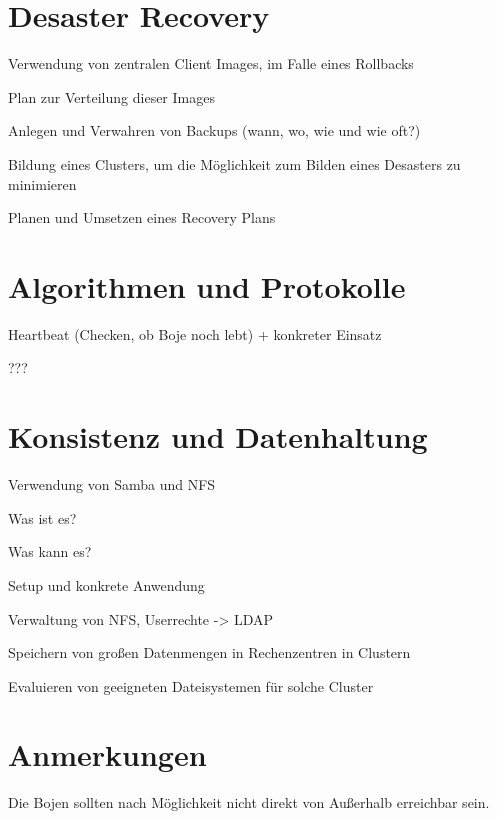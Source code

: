 \section{Desaster Recovery}
\label{sec:Desaster Recovery}
Verwendung von zentralen Client Images, im Falle eines Rollbacks

Plan zur Verteilung dieser Images

Anlegen und Verwahren von Backups (wann, wo, wie und wie oft?)

Bildung eines Clusters, um die Möglichkeit zum Bilden eines Desasters zu minimieren

Planen und Umsetzen eines Recovery Plans


\section{Algorithmen und Protokolle}
\label{sec:Algorithmen und Protokolle}
Heartbeat (Checken, ob Boje noch lebt) +  konkreter Einsatz

???



\section{Konsistenz und Datenhaltung}
\label{sec:Konsistenz und Datenhaltung}
Verwendung von Samba und NFS

Was ist es?

Was kann es?

Setup und konkrete Anwendung

Verwaltung von NFS, Userrechte -> LDAP

Speichern von großen Datenmengen in Rechenzentren in Clustern

Evaluieren von geeigneten Dateisystemen für solche Cluster


\section{Anmerkungen}
\label{sec:Anmerkungen}
Die Bojen sollten nach Möglichkeit nicht direkt von Außerhalb erreichbar sein.



%
